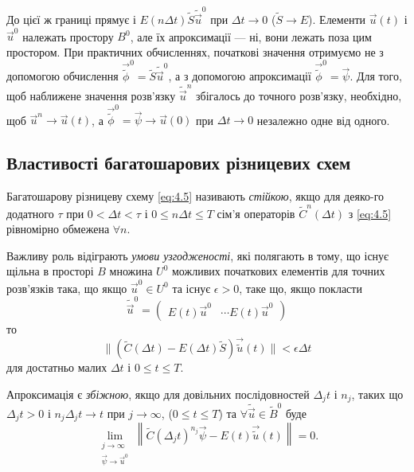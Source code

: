 До цієї ж границі прямує і $E (n \Delta t) \tilde S \tilde{\vec{u}}^0$ при $\Delta t \to 0$ ($\tilde S \to E$). Елементи $\vec u(t)$ і $\vec u^0$ належать простору $B^0$, але їх апроксимації --- ні, вони лежать поза цим простором. При практичних обчисленнях, початкові значення отримуємо не з допомогою обчислення $\vec{\tilde{\phi}}^0 = \tilde S \tilde{\vec{u}}^0$, а з допомогою апроксимації $\vec{\tilde{\phi}}^0 = \vec \psi$. Для того, щоб наближене значення розв'язку $\tilde{\vec{u}}^n$ збігалось до точного розв'язку, необхідно, щоб $\vec u^n \to \vec u(t)$, а $\vec{\tilde{\phi}}^0 = \vec \psi \to \vec u(0)$ при $\Delta t \to 0$ незалежно одне від одного. 

\subsection{Властивості багатошарових різницевих схем}

\begin{definition}
    Багатошарову різницеву схему \eqref{eq:4.5} називають \textit{стійкою}, якщо для деяко-го додатного $\tau$ при $0 < \Delta t < \tau$ і $0 \le n \Delta t \le T$ сім'я операторів $\tilde C^n(\Delta t)$ з \eqref{eq:4.5} рівномірно обмежена $\forall n$.
\end{definition}

\begin{definition}
    Важливу роль відіграють \textit{умови узгодженості}, які полягають в тому, що існує щільна в просторі $B$ множина $U^0$ можливих початкових елементів для точних розв'язків така, що якщо $\vec u^0 \in U^0$ та існує $\epsilon > 0$, таке що, якщо покласти 
    \begin{equation}
        \tilde{\vec{u}}^0 = \begin{pmatrix} E(t) \vec u^0 & \cdots E(t) \vec u^0 \end{pmatrix}
    \end{equation}
    то 
    \begin{equation}
        \label{eq:4.6}
        \| (\tilde C(\Delta t) - E(\Delta t) \tilde S) \vec{\tilde{u}}(t) \| < \epsilon \Delta t
    \end{equation}
    для достатньо малих $\Delta t$ і $0 \le t \le T$.
\end{definition}

\begin{definition}
    Апроксимація є \textit{збіжною}, якщо для довільних послідовностей $\Delta_j t$ і $n_j$, таких що $\Delta_j t > 0$ і $n_j \Delta_j t \to t$ при $j \to \infty$, ($0 \le t \le T$) та $\forall \tilde{\vec{u}} \in \tilde B^0$ буде
    \begin{equation}
        \lim_{\substack{j \to \infty \\ \vec \psi \to \vec u^0}} \left\| \tilde C(\Delta_j t)^{n_j} \vec \psi - E(t) \vec{\tilde{u}}(t) \right\| = 0.
    \end{equation}
\end{definition}

